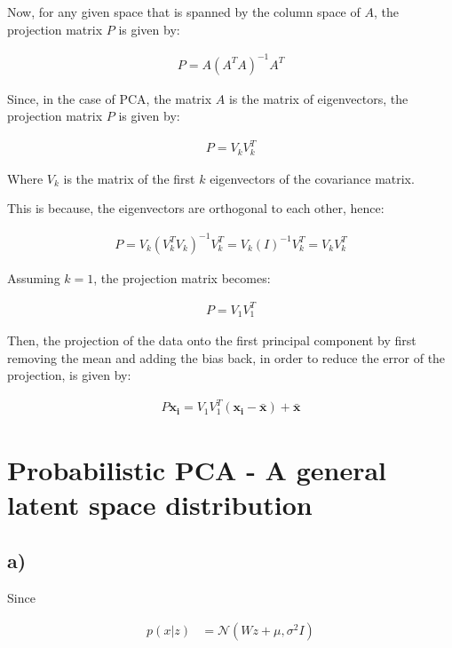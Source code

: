 \documentclass[12pt,a4paper,oneside]{paper}
\begin{document}
Now, for any given space that is spanned by the column space of $A$, the projection matrix $P$ is given by:

\begin{align*}
    P = A (A^T A)^{-1} A^T
\end{align*}

Since, in the case of PCA, the matrix $A$ is the matrix of eigenvectors, the projection matrix $P$ is given by:

\begin{align*}
    P = V_k V_k^T
\end{align*}

Where \( V_k \) is the matrix of the first \( k \) eigenvectors of the covariance matrix.

This is because, the eigenvectors are orthogonal to each other, hence:

\begin{align*}
    P = V_k (V_k^T V_k)^{-1} V_k^T = V_k (I)^{-1} V_k^T = V_k V_k^T
\end{align*}

Assuming $k = 1$, the projection matrix becomes:

\begin{align*}
    P = V_1 V_1^T
\end{align*}

Then, the projection of the data onto the first principal component by first removing the mean and adding the bias back, 
in order to reduce the error of the projection, is given by:

\begin{align*}
    P \bm{x_i} = V_1 V_1^T \left( \bm{x_i} - \bm{\bar{x}} \right) + \bm{\bar{x}}
\end{align*}

\newpage
\section{Probabilistic PCA - A general latent space distribution}

\subsection*{a)}

Since 

\begin{align*}
    p(x | z) &= \mathcal{N}(Wz + \mu, \sigma^2 I) \\
\end{align*}
\end{document}
